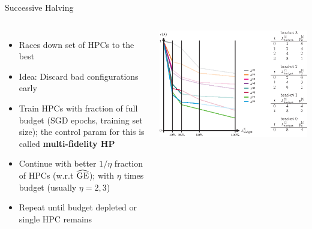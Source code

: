 \documentclass[11pt,compress,t,notes=noshow, xcolor=table]{beamer}
\begin{document}
\begin{vbframe}{Successive Halving}

\begin{columns}
\begin{itemize}
\item Races down set of HPCs to the best
\item Idea: Discard bad configurations early
\item Train HPCs with fraction of full budget (SGD epochs, training set size); the control param for this is called \textbf{multi-fidelity HP}
\item Continue with better $1/\eta$ fraction of HPCs (w.r.t $\widehat{\mathrm{GE}}{}$); 
with $\eta$ times budget (usually $\eta = 2,3$)
\item Repeat until budget depleted or single HPC remains
\end{itemize}
\begin{center}
\includegraphics[trim=0 0 100 0, clip, width = 1.0\textwidth]{figure/hyperband.eps}
\end{center}
\end{columns}
\end{vbframe}
\end{document}
